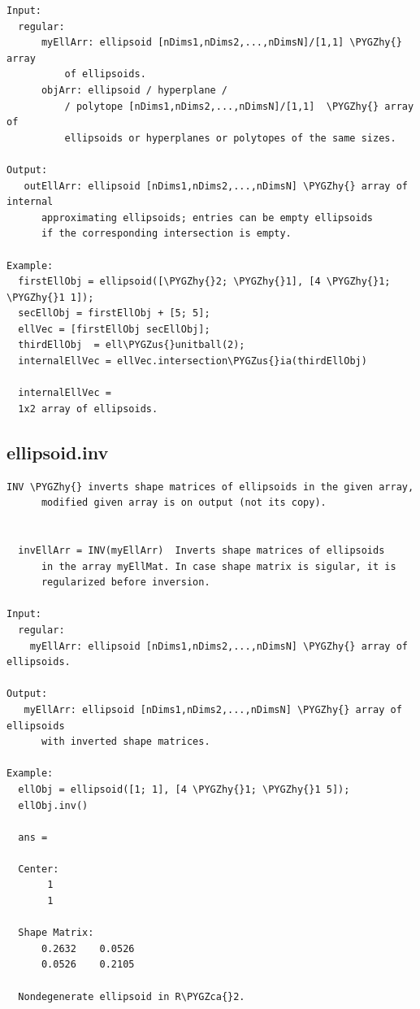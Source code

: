 \documentclass[letterpaper,10pt,english]{sphinxmanual}
\def\PYGZus{\char`\_}
\def\PYGZca{\char`\^}
\def\PYGZhy{\char`\-}
\begin{document}
\begin{Verbatim}[commandchars=\\\{\}]
Input:
  regular:
      myEllArr: ellipsoid [nDims1,nDims2,...,nDimsN]/[1,1] \PYGZhy{} array
          of ellipsoids.
      objArr: ellipsoid / hyperplane /
          / polytope [nDims1,nDims2,...,nDimsN]/[1,1]  \PYGZhy{} array of
          ellipsoids or hyperplanes or polytopes of the same sizes.

Output:
   outEllArr: ellipsoid [nDims1,nDims2,...,nDimsN] \PYGZhy{} array of internal
      approximating ellipsoids; entries can be empty ellipsoids
      if the corresponding intersection is empty.

Example:
  firstEllObj = ellipsoid([\PYGZhy{}2; \PYGZhy{}1], [4 \PYGZhy{}1; \PYGZhy{}1 1]);
  secEllObj = firstEllObj + [5; 5];
  ellVec = [firstEllObj secEllObj];
  thirdEllObj  = ell\PYGZus{}unitball(2);
  internalEllVec = ellVec.intersection\PYGZus{}ia(thirdEllObj)

  internalEllVec =
  1x2 array of ellipsoids.
\end{Verbatim}


\subsection{ellipsoid.inv}
\label{chap_functions:ellipsoid-inv}
\begin{Verbatim}[commandchars=\\\{\}]
INV \PYGZhy{} inverts shape matrices of ellipsoids in the given array,
      modified given array is on output (not its copy).


  invEllArr = INV(myEllArr)  Inverts shape matrices of ellipsoids
      in the array myEllMat. In case shape matrix is sigular, it is
      regularized before inversion.

Input:
  regular:
    myEllArr: ellipsoid [nDims1,nDims2,...,nDimsN] \PYGZhy{} array of ellipsoids.

Output:
   myEllArr: ellipsoid [nDims1,nDims2,...,nDimsN] \PYGZhy{} array of ellipsoids
      with inverted shape matrices.

Example:
  ellObj = ellipsoid([1; 1], [4 \PYGZhy{}1; \PYGZhy{}1 5]);
  ellObj.inv()

  ans =

  Center:
       1
       1

  Shape Matrix:
      0.2632    0.0526
      0.0526    0.2105

  Nondegenerate ellipsoid in R\PYGZca{}2.
\end{Verbatim}
\end{document}
